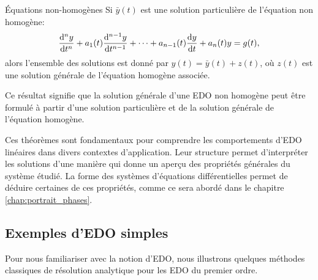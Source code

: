             \begin{theorem}{Équations non-homogènes}  
                Si $\bar{y}(t)$ est une solution particulière de l'équation non homogène:
                \begin{equation}
                \frac {\mathrm d^{n}{y}}{\mathrm d{t}^{n}} + a_1(t)\frac {\mathrm d^{n-1}{y}}{\mathrm d{t}^{n-1}} + \dots + a_{n-1}(t) \frac {\mathrm d{y}}{\mathrm d{t}} + a_n(t)y=g(t),
                \end{equation}
                alors l'ensemble des solutions est donné par $y(t)=\bar{y}(t) + z(t)$, où $z(t)$ est une solution générale de l'équation homogène associée.
            \end{theorem}
            Ce résultat signifie que la solution générale d'une EDO non homogène peut être formulé à partir d'une solution particulière et de la solution générale de l'équation homogène.
            
            Ces théorèmes sont fondamentaux pour comprendre les comportements d'EDO linéaires dans divers contextes d'application. Leur structure permet d'interpréter les solutions d'une manière qui donne un aperçu des propriétés générales du système étudié. La forme des systèmes d'équations différentielles permet de déduire certaines de ces propriétés, comme ce sera abordé dans le chapitre \ref{chap:portrait_phases}.

        \subsection{Exemples d'EDO simples}
            Pour nous familiariser avec la notion d'EDO, nous illustrons quelques méthodes classiques de résolution analytique pour les EDO du premier ordre. 
